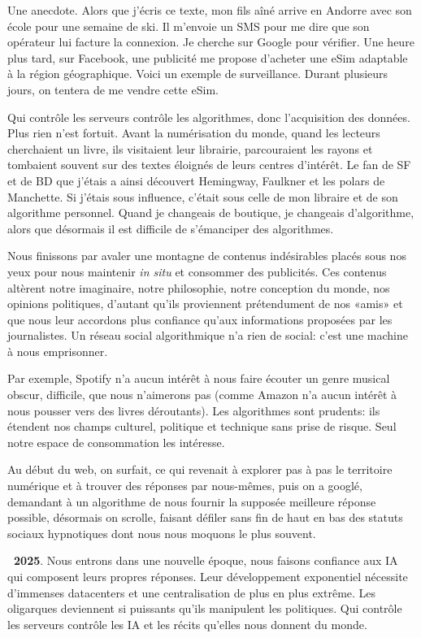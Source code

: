\documentclass[a5paper, 10pt, twoside]{book}
\begin{document}
Une anecdote. Alors que j’écris ce texte, mon fils aîné arrive en
Andorre avec son école pour une semaine de ski. Il m’envoie un SMS pour
me dire que son opérateur lui facture la connexion. Je cherche sur
Google pour vérifier. Une heure plus tard, sur Facebook, une publicité
me propose d’acheter une eSim adaptable à la région géographique. Voici
un exemple de surveillance. Durant plusieurs jours, on tentera de me
vendre cette eSim.

Qui contrôle les serveurs contrôle les algorithmes, donc l’acquisition
des données. Plus rien n’est fortuit. Avant la numérisation du monde,
quand les lecteurs cherchaient un livre, ils visitaient leur librairie,
parcouraient les rayons et tombaient souvent sur des textes éloignés de
leurs centres d’intérêt. Le fan de SF et de BD que j’étais a ainsi
découvert Hemingway, Faulkner et les polars de Manchette. Si j’étais
sous influence, c’était sous celle de mon libraire et de son algorithme
personnel. Quand je changeais de boutique, je changeais d’algorithme,
alors que désormais il est difficile de s’émanciper des algorithmes.

Nous finissons par avaler une montagne de contenus indésirables placés
sous nos yeux pour nous maintenir \emph{in situ} et consommer des
publicités. Ces contenus altèrent notre imaginaire, notre philosophie,
notre conception du monde, nos opinions politiques, d’autant qu’ils
proviennent prétendument de nos «amis» et que nous leur accordons plus
confiance qu’aux informations proposées par les journalistes. Un réseau
social algorithmique n’a rien de social: c’est une machine à nous
emprisonner.

Par exemple, Spotify n’a aucun intérêt à nous faire écouter un genre
musical obscur, difficile, que nous n’aimerons pas (comme Amazon n’a
aucun intérêt à nous pousser vers des livres déroutants). Les
algorithmes sont prudents: ils étendent nos champs culturel, politique
et technique sans prise de risque. Seul notre espace de consommation les
intéresse.

Au début du web, on surfait, ce qui revenait à explorer pas à pas le
territoire numérique et à trouver des réponses par nous-mêmes, puis on a
googlé, demandant à un algorithme de nous fournir la supposée meilleure
réponse possible, désormais on scrolle, faisant défiler sans fin de haut
en bas des statuts sociaux hypnotiques dont nous nous moquons le plus
souvent.

\textbf{~2025}. Nous entrons dans une nouvelle époque, nous faisons
confiance aux IA qui composent leurs propres réponses. Leur
développement exponentiel nécessite d’immenses datacenters et une
centralisation de plus en plus extrême. Les oligarques deviennent si
puissants qu’ils manipulent les politiques. Qui contrôle les serveurs
contrôle les IA et les récits qu’elles nous donnent du monde.
\end{document}
